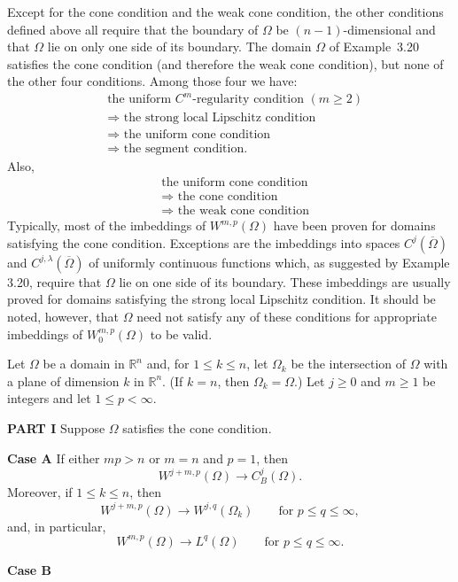 \begin{para}
  Except for the cone condition and the weak cone condition,
  the other conditions defined above all require that the boundary of $\Omega$ be $(n-1)$-dimensional
  and that $\Omega$ lie on only one side of its boundary. The domain $\Omega$ of Example~3.20
  satisfies the cone condition (and therefore the weak cone condition), but none of the other four conditions. 
  Among those four we have:
  \begin{align*}
    & \text{the uniform $C^m$-regularity condition $(m \geq 2)$} \\
    & \text{$\Longrightarrow$ the strong local Lipschitz condition} \\
    & \text{$\Longrightarrow$ the uniform cone condition} \\
    & \text{$\Longrightarrow$ the segment condition.}
  \end{align*}
  Also,
  \begin{align*}
    & \text{the uniform cone condition} \\
    & \text{$\Longrightarrow$ the cone condition} \\
    & \text{$\Longrightarrow$ the weak cone condition}
  \end{align*}
  Typically, most of the imbeddings of $W^{m,p}(\Omega)$ have been proven for domains
  satisfying the cone condition. Exceptions are the imbeddings into spaces $C^j(\overline{\Omega})$
  and $C^{j, \lambda}(\overline{\Omega})$ of uniformly continuous functions which, as suggested by 
  Example 3.20, require that $\Omega$ lie on one side of its boundary. These imbeddings are 
  usually proved for domains satisfying the strong local Lipschitz condition. It should be noted, 
  however, that $\Omega$ need not satisfy any of these conditions for appropriate imbeddings of 
  $W_0^{m, p}(\Omega)$ to be valid.
\end{para}

\begin{theorem}
  Let $\Omega$ be a domain in $\mathbb{R}^n$ and, for $1\leq k\leq n$,
  let $\Omega_k$ be the intersection of $\Omega$ with a plane of dimension $k$
  in $\mathbb{R}^n$. (If $k=n$, then $\Omega_k = \Omega.$)
  Let $j\geq 0$ and $m\geq 1$ be integers and let $1\leq p < \infty$.

  \noindent\textbf{PART I} Suppose $\Omega$ satisfies the cone condition.

  \noindent\textbf{Case A} If either $mp > n$ or $m=n$ and $p=1$, then
  \begin{equation}
    W^{j+m, p}(\Omega) \to C_B^j(\Omega).
  \end{equation}
  Moreover, if $1\leq k\leq n$, then
  \begin{equation}
    W^{j+m, p}(\Omega) \to W^{j, q}(\Omega_k)\qquad \text{for } p\leq q\leq\infty,
  \end{equation}
  and, in particular,
  \[W^{m,p}(\Omega) \to L^q(\Omega)\qquad \text{for } p\leq q\leq\infty.\]

  \noindent \textbf{Case B}
\end{theorem}


